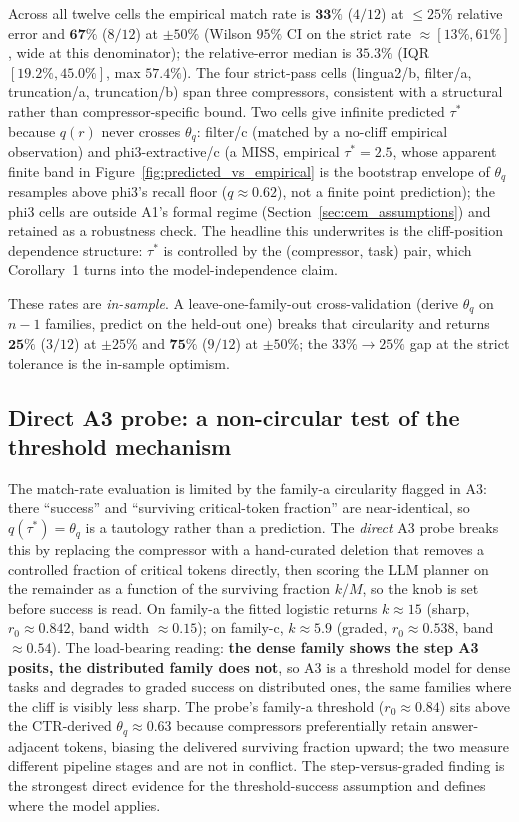 Across all twelve cells the empirical match rate is $\mathbf{33\%}$
($4/12$) at $\le25\%$ relative error and $\mathbf{67\%}$ ($8/12$) at
$\pm50\%$ (Wilson $95\%$ CI on the strict rate $\approx[13\%,61\%]$,
wide at this denominator); the relative-error median is $35.3\%$
(IQR $[19.2\%,45.0\%]$, max $57.4\%$). The four strict-pass cells
(lingua2/b, filter/a, truncation/a, truncation/b) span three
compressors, consistent with a structural rather than
compressor-specific bound. Two cells give infinite predicted
$\tau^{*}$ because $q(r)$ never crosses $\theta_q$: filter/c (matched
by a no-cliff empirical observation) and phi3-extractive/c (a MISS,
empirical $\tau^{*}=2.5$, whose apparent finite band in
Figure~\ref{fig:predicted_vs_empirical} is the bootstrap envelope of
$\theta_q$ resamples above phi3's recall floor ($q\approx0.62$), not a
finite point prediction); the phi3 cells are outside A1's formal
regime (Section~\ref{sec:cem_assumptions}) and retained as a
robustness check. The headline this underwrites is the
cliff-position dependence structure: $\tau^{*}$ is controlled by the
(compressor, task) pair, which Corollary~1 turns into the
model-independence claim.

These rates are \emph{in-sample}. A leave-one-family-out
cross-validation (derive $\theta_q$ on $n{-}1$ families, predict on
the held-out one) breaks that circularity and returns $\mathbf{25\%}$
($3/12$) at $\pm25\%$ and $\mathbf{75\%}$ ($9/12$) at $\pm50\%$; the
$33\%\to25\%$ gap at the strict tolerance is the in-sample optimism.

\subsection{Direct A3 probe: a non-circular test of the threshold mechanism}
\label{sec:a3_probe}

The match-rate evaluation is limited by the family-a circularity
flagged in A3: there ``success'' and ``surviving critical-token
fraction'' are near-identical, so $q(\tau^{*})=\theta_q$ is a
tautology rather than a prediction. The \emph{direct} A3 probe breaks this by replacing the compressor
with a hand-curated deletion that removes a controlled fraction of
critical tokens directly, then scoring the LLM planner on the
remainder as a function of the surviving fraction $k/M$, so the knob
is set before success is read. On family-a the fitted logistic
returns $k\approx15$ (sharp, $r_0\approx0.842$, band width
$\approx0.15$); on family-c, $k\approx5.9$ (graded, $r_0\approx0.538$,
band $\approx0.54$). The load-bearing reading: \textbf{the dense
family shows the step A3 posits, the distributed family does not}, so
A3 is a threshold model for dense tasks and degrades to graded
success on distributed ones, the same families where the cliff is
visibly less sharp. The probe's family-a threshold ($r_0\approx0.84$)
sits above the CTR-derived $\theta_q\approx0.63$ because compressors
preferentially retain answer-adjacent tokens, biasing the delivered
surviving fraction upward; the two measure different pipeline stages
and are not in conflict. The step-versus-graded finding is the
strongest direct evidence for the threshold-success assumption and
defines where the model applies.

